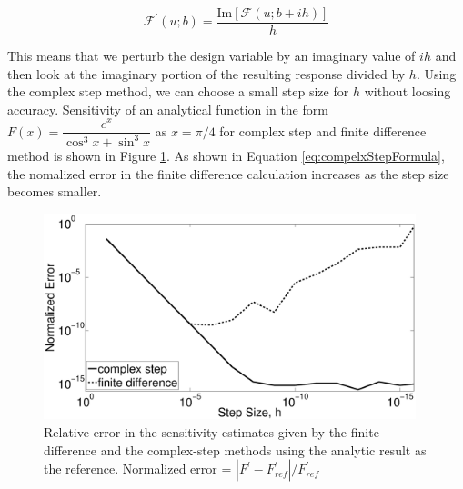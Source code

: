 \documentclass[12pt]{aiaa-pretty}
\begin{document}
%
\begin{equation}\label{eq:compelxStepFormula}
	\mathcal{F}^\prime\left(u; b\right) = \frac{\text{Im}\left[ \mathcal{F}\left(u; b + ih\right) \right]}{h}
\end{equation}
%

This means that we perturb the design variable by an imaginary value of $ih$ and then look at the imaginary portion of the resulting response divided by $h$. Using the complex step method, we can choose a small step size for $h$ without loosing accuracy. Sensitivity of an analytical function in the form $F(x) = \dfrac{e^x}{\cos^3 x + \sin^3 x}$ as $x = \pi/4$ for complex step and finite difference method is shown in Figure \ref{fig:CSvsFD}. As shown in Equation \eqref{eq:compelxStepFormula}, the nomalized error in the finite difference calculation increases as the step size becomes smaller.

%
\begin{figure}[H]
	\centering
	\includegraphics[height=6.0cm]{figure/FDvsCS.eps}
	\caption{Relative error in the sensitivity estimates given by the finite-difference and the complex-step methods using the analytic result as the reference. Normalized error = $\left| F^\prime - F^\prime_{ref} \right| / F^\prime_{ref}$}
	\label{fig:CSvsFD}
\end{figure}
%

\end{document}
